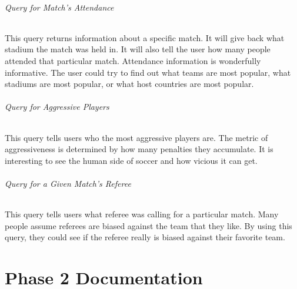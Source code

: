 \documentclass{article}
\begin{document}
\paragraph{Query for Match's Attendance}
This query returns information about a specific match. It will give back what stadium the match was held in. It will also tell the user how many people attended that particular match. Attendance information is wonderfully informative. The user could try to find out what teams are most popular, what stadiums are most popular, or what host countries are most popular.  
\paragraph{Query for Aggressive Players}
This query tells users who the most aggressive players are. The metric of aggressiveness is determined by how many penalties they accumulate. It is interesting to see the human side of soccer and how vicious it can get.
\paragraph{Query for a Given Match's Referee}
This query tells users what referee was calling for a particular match. Many people assume referees are biased against the team that they like. By using this query, they could see if the referee really is biased against their favorite team.

\part{Phase 2 Documentation}
\end{document}
